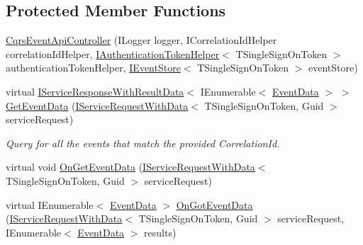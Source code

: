 \subsection*{Protected Member Functions}
\begin{DoxyCompactItemize}
\item 
\hyperlink{classCqrs_1_1WebApi_1_1CqrsEventApiController_a1ab3a601bcbce3ff1a5d935b2c2f8065}{Cqrs\+Event\+Api\+Controller} (I\+Logger logger, I\+Correlation\+Id\+Helper correlation\+Id\+Helper, \hyperlink{interfaceCqrs_1_1Authentication_1_1IAuthenticationTokenHelper}{I\+Authentication\+Token\+Helper}$<$ T\+Single\+Sign\+On\+Token $>$ authentication\+Token\+Helper, \hyperlink{interfaceCqrs_1_1Events_1_1IEventStore}{I\+Event\+Store}$<$ T\+Single\+Sign\+On\+Token $>$ event\+Store)
\item 
virtual \hyperlink{interfaceCqrs_1_1Services_1_1IServiceResponseWithResultData}{I\+Service\+Response\+With\+Result\+Data}$<$ I\+Enumerable$<$ \hyperlink{classCqrs_1_1Events_1_1EventData}{Event\+Data} $>$ $>$ \hyperlink{classCqrs_1_1WebApi_1_1CqrsEventApiController_aac0079ced115761a0ab605eaebe0801b}{Get\+Event\+Data} (\hyperlink{interfaceCqrs_1_1Services_1_1IServiceRequestWithData}{I\+Service\+Request\+With\+Data}$<$ T\+Single\+Sign\+On\+Token, Guid $>$ service\+Request)
\begin{DoxyCompactList}\small\item\em Query for all the events that match the provided Correlation\+Id. \end{DoxyCompactList}\item 
virtual void \hyperlink{classCqrs_1_1WebApi_1_1CqrsEventApiController_a705b40b973640de14f7b8b7b4c6eb1fe}{On\+Get\+Event\+Data} (\hyperlink{interfaceCqrs_1_1Services_1_1IServiceRequestWithData}{I\+Service\+Request\+With\+Data}$<$ T\+Single\+Sign\+On\+Token, Guid $>$ service\+Request)
\item 
virtual I\+Enumerable$<$ \hyperlink{classCqrs_1_1Events_1_1EventData}{Event\+Data} $>$ \hyperlink{classCqrs_1_1WebApi_1_1CqrsEventApiController_a9f0147c846a7fd7628d199ff268d178e}{On\+Got\+Event\+Data} (\hyperlink{interfaceCqrs_1_1Services_1_1IServiceRequestWithData}{I\+Service\+Request\+With\+Data}$<$ T\+Single\+Sign\+On\+Token, Guid $>$ service\+Request, I\+Enumerable$<$ \hyperlink{classCqrs_1_1Events_1_1EventData}{Event\+Data} $>$ results)
\end{DoxyCompactItemize}
